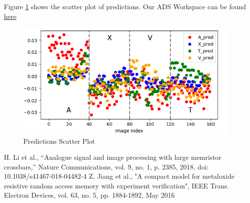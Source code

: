 \documentclass[conference]{IEEEtran}  %
\begin{document}
Figure \ref{fig:9} shows the scatter plot of predictions. Our ADS Workspace can be found \href{https://github.com/RishiNandha/CMOS-Binary-Neural-Network/blob/main/78.5%25_Accuracy.7zads}{here}

\begin{figure}[h]
    \centering
    \includegraphics[width=0.85\linewidth]{Predictions_Scatter.png}
    \caption{Predictions Scatter Plot}
    \label{fig:9}
\end{figure}

\begin{thebibliography}{00}
 H. Li et al., “Analogue signal and image processing with large memristor crossbars,” Nature Communications, vol. 9, no. 1, p. 2385, 2018, doi: 10.1038/s41467-018-04482-4
 Z. Jiang et al., "A compact model for metaloxide resistive random access memory with experiment verification", IEEE Trans. Electron Devices, vol. 63, no. 5, pp. 1884-1892, May 2016
\end{thebibliography}
\end{document}
